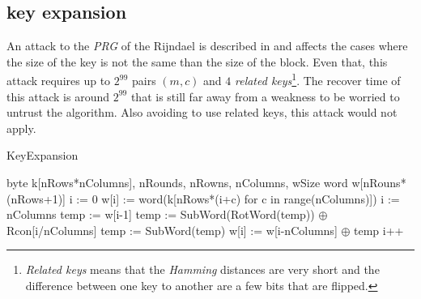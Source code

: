 \documentclass[10pt,a4paper,twoside]{llncs}
\begin{document}
\subsection{key expansion}\label{sec:keyExpansion}
An attack to the \emph{PRG} of the Rijndael is described in \cite{fullaes-192-256} and affects the cases where the size of the key is not the same than the size of the block. Even that, this attack requires up to $2^{99}$ pairs $(m,c)$ and $4$ \emph{related keys}\footnote{\emph{Related keys} means that the \emph{Hamming} distances are very short and the difference between one key to another are a few bits that are flipped.}. The recover time of this attack is around $2^{99}$ that is still far away from a weakness to be worried to untrust the algorithm. Also avoiding to use related keys, this attack would not apply.


\begin{algorithm}
 \caption{KeyExpansion}
 \label{alg:keyExpansion}
 \begin{algorithmic}[1]
  \REQUIRE byte k[nRows*nColumns], nRounds, nRowns, nColumns, wSize
  \ENSURE word w[nRouns*(nRows+1)]
  \STATE i := 0
    \STATE w[i] := word(k[nRows*(i+c) for c in range(nColumns)])
  \ENDWHILE
  \STATE i := nColumns
    \STATE temp := w[i-1]
      \STATE temp := SubWord(RotWord(temp)) $\oplus$ Rcon[i/nColumns]
    \ELSE
      \STATE temp := SubWord(temp)
    \ENDIF
    \STATE w[i] := w[i-nColumns] $\oplus$ temp
    \STATE i++
  \ENDWHILE
 \end{algorithmic}
\end{algorithm}
\end{document}
